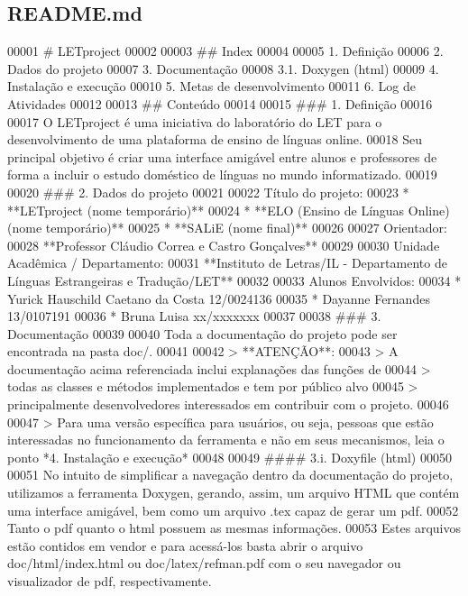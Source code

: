 \hypertarget{README_8md_source}{}\subsection{R\+E\+A\+D\+M\+E.\+md}

\begin{DoxyCode}
00001 # LETproject
00002 
00003 ## Index
00004 
00005 1. Definição
00006 2. Dados do projeto
00007 3. Documentação
00008   3.1. Doxygen (html)
00009 4. Instalação e execução
00010 5. Metas de desenvolvimento
00011 6. Log de Atividades
00012 
00013 ## Conteúdo
00014 
00015 ### 1. Definição
00016 
00017 O LETproject é uma iniciativa do laboratório do LET para o desenvolvimento de uma plataforma de ensino
       de línguas online.
00018 Seu principal objetivo é criar uma interface amigável entre alunos e professores de forma a incluir o
       estudo doméstico de línguas no mundo informatizado.
00019 
00020 ### 2. Dados do projeto
00021 
00022 Título do projeto:
00023 * **LETproject (nome temporário)**
00024 * **ELO (Ensino de Línguas Online) (nome temporário)**
00025 * **SALiE (nome final)**
00026 
00027 Orientador:
00028 **Professor Cláudio Correa e Castro Gonçalves**
00029 
00030 Unidade Acadêmica / Departamento:
00031 **Instituto de Letras/IL - Departamento de Línguas Estrangeiras e Tradução/LET**
00032 
00033 Alunos Envolvidos:
00034 * Yurick Hauschild Caetano da Costa 12/0024136
00035 * Dayanne Fernandes 13/0107191
00036 * Bruna Luisa xx/xxxxxxx
00037 
00038 ### 3. Documentação
00039 
00040 Toda a documentação do projeto pode ser encontrada na pasta doc/.
00041 
00042 > **ATENÇÃO**:
00043 > A documentação acima referenciada inclui explanações das funções de
00044 > todas as classes e métodos implementados e tem por público alvo
00045 > principalmente desenvolvedores interessados em contribuir com o projeto.
00046 
00047 > Para uma versão específica para usuários, ou seja, pessoas que estão interessadas no funcionamento
       da ferramenta e não em seus mecanismos, leia o ponto *4. Instalação e execução*
00048 
00049 #### 3.i. Doxyfile (html)
00050 
00051  No intuito de simplificar a navegação dentro da documentação do projeto, utilizamos a ferramenta
       Doxygen, gerando, assim, um arquivo HTML que contém uma interface amigável, bem como um arquivo .tex capaz de
       gerar um pdf.
00052  Tanto o pdf quanto o html possuem as mesmas informações.
00053  Estes arquivos estão contidos em vendor e para acessá-los basta abrir o arquivo doc/html/index.html
       ou doc/latex/refman.pdf com o seu navegador ou visualizador de pdf, respectivamente.

\end{DoxyCode}
